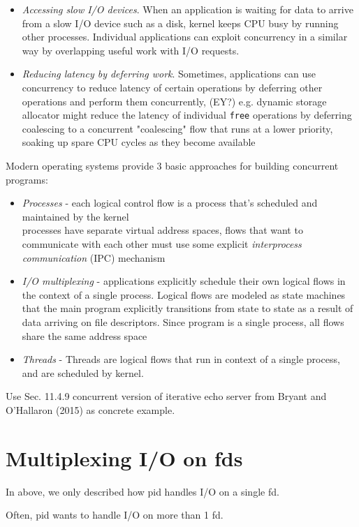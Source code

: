 \documentclass[10pt]{amsart}
\begin{document}
\begin{multicols*}{2}
\begin{itemize}
	\item \emph{Accessing slow I/O devices}. When an application is waiting for data to arrive from a slow I/O device such as a disk, kernel keeps CPU busy by running other processes. Individual applications can exploit concurrency in a similar way by overlapping useful work with I/O requests.
	\item \emph{Reducing latency by deferring work}. Sometimes, applications can use concurrency to reduce latency of certain operations by deferring other operations and perform them concurrently, (EY?) e.g. dynamic storage allocator might reduce the latency of individual \verb|free| operations by deferring coalescing to a concurrent "coalescing" flow that runs at a lower priority, soaking up spare CPU cycles as they become available
\end{itemize}

Modern operating systems provide 3 basic approaches for building concurrent programs:
\begin{itemize}
	\item \emph{Processes} - each logical control flow is a process that's scheduled and maintained by the kernel \\
	processes have separate virtual address spaces, flows that want to communicate with each other must use some explicit \emph{interprocess communication} (IPC) mechanism
	\item \emph{I/O multiplexing} - applications explicitly schedule their own logical flows in the context of a single process. Logical flows are modeled as state machines that the main program explicitly transitions from state to state as a result of data arriving on file descriptors. Since program is a single process, all flows share the same address space
	\item \emph{Threads} - Threads are logical flows that run in context of a single process, and are scheduled by kernel.
\end{itemize}
Use Sec. 11.4.9 concurrent version of iterative echo server from Bryant and O'Hallaron (2015) \cite{BrOH2016} as concrete example.

\section{Multiplexing I/O on fds}

In above, we only described how pid handles I/O on a single fd.

Often, pid wants to handle I/O on more than 1 fd.


\end{multicols*}
\end{document}
